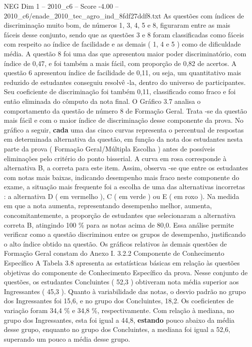 \begin{textsample}{NEG Dim 1 – 2010\_c6 – Score -4.00 – 2010\_c6/enade\_2010\_tec\_agro\_ind\_8fdf27ddf8.txt}
As questões com índices de discriminação muito bom, de números 1, 3, 4, 5 e 8, figuraram entre as mais fáceis desse conjunto, sendo que as questões 3 e 8 foram classificadas como fáceis com respeito ao índice de facilidade e as demais ( 1, 4 e 5 ) como de dificuldade média.
A questão 8 foi uma das que apresentou maior poder discriminatório, com índice de 0,47, e foi também a mais fácil, com proporção de 0,82 de acertos.
A questão 6 apresentou índice de facilidade de 0,11, ou seja, um quantitativo mais reduzido de estudantes conseguiu resolvê -la, dentro do universo de participantes.
Seu coeficiente de discriminação foi também 0,11, classificado como fraco e foi então eliminada do cômputo da nota final.
O Gráfico 3.7 analisa o comportamento da questão de número 8 de Formação Geral.
Trata -se da questão mais fácil e com o maior índice de discriminação desse componente da prova.
No gráfico a seguir, \textbf{cada} uma das cinco curvas representa o percentual de respostas em determinada alternativa da questão, em função da nota dos estudantes nesta parte da prova ( Formação Geral/Múltipla Escolha ) antes de possíveis eliminações pelo critério do ponto bisserial.
A curva em rosa corresponde à alternativa B, a correta para este item.
Assim, observa -se que entre os estudantes com notas mais baixas, indicando desempenho mais fraco neste componente do exame, a situação mais frequente foi a escolha de uma das alternativas incorretas : a alternativa D ( em vermelho ), C ( em verde ) ou E ( em roxo ).
Na medida em que a nota aumenta, representando desempenho melhor, aumenta, concomitantemente, a proporção de estudantes que selecionaram a alternativa correta B, atingindo 100 \% para as notas acima de 80,0.
Essa análise permite verificar como a questão discriminou entre os grupos de desempenho, justificando o alto índice obtido na questão.
Os gráficos relativos às demais questões de Formação Geral constam do Anexo I. 3.2.2 Componente de Conhecimento Específico A Tabela 3.8 apresenta as estatísticas básicas em relação às questões objetivas do componente de Conhecimento Específico da prova.
Nesse conjunto de questões, os estudantes Concluintes ( 52,3 ) obtiveram nota média superior aos Ingressantes ( 45,3 ).
Quanto à variabilidade das notas, o desvio padrão no grupo dos Ingressantes foi 15,6, e no grupo dos Concluintes, 18,2.
Os coeficientes de variação foram 34,4 \% e 34,8 \%, respectivamente.
Com relação à mediana, no grupo dos Ingressantes, esta foi igual a 44,8, \textbf{estando} pouco abaixo da média desse grupo, enquanto no grupo dos Concluintes, a mediana foi igual a 52,6, superando um pouco a média desse grupo.

\end{textsample}
